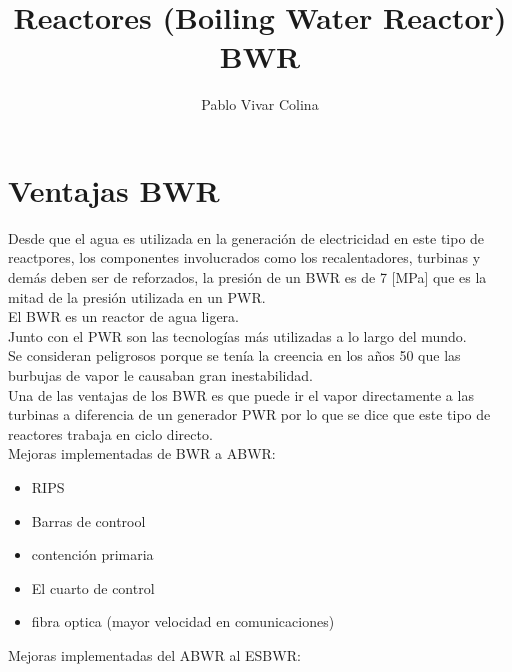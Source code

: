 \documentclass[]{article}
\title{Reactores (Boiling Water Reactor) BWR}
\author{Pablo Vivar Colina}
\begin{document}
	

\maketitle

\tableofcontents  %



\section{Ventajas BWR}

Desde que el agua es utilizada en la generación de electricidad en este tipo de reactpores, los componentes involucrados como los recalentadores, turbinas y demás deben ser de reforzados, la presión de un BWR es de 7 [MPa] que es la mitad de la presión utilizada en un PWR.\citep{Lamarsh2001}\\

El BWR es un reactor de agua ligera.\\

Junto con el PWR son las tecnologías más utilizadas a lo largo del mundo.\\

Se consideran peligrosos porque se tenía la creencia en los años 50 que las burbujas de vapor le causaban gran inestabilidad.\\

Una de las ventajas de los BWR es que puede ir el vapor directamente a las turbinas a diferencia de un generador PWR por lo que se dice que este tipo de reactores trabaja en ciclo directo.\\[1cm]

Mejoras implementadas de BWR a ABWR:\\

\begin{multicols}{2}
\begin{itemize}
	\item RIPS
	\item Barras de controol
	\item contención primaria
	\item El cuarto de control
	\item fibra optica (mayor velocidad en comunicaciones)
\end{itemize}
\end{multicols}

Mejoras implementadas del ABWR al ESBWR:\\
\end{document}
